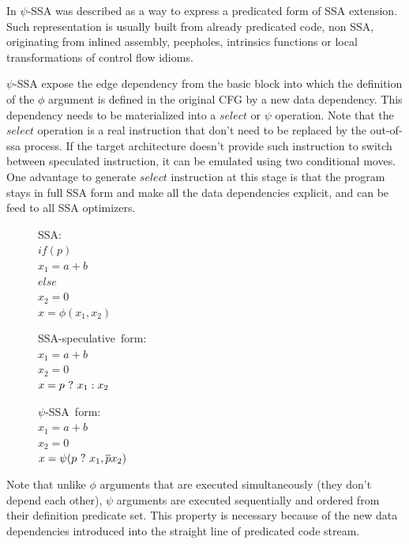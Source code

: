 In \cite{Stoutchinin:2001:ESS:563998.564022} $\psi$-SSA was described as a way to express a predicated form of SSA extension. Such representation is usually built from already predicated code, non SSA, originating from inlined assembly, peepholes, intrinsics functions or local transformations of control flow idioms. 

$\psi$-SSA expose the edge dependency from the basic block into which the definition of the $\phi$ argument is defined in the original CFG by a new data dependency. This dependency needs to be materialized into a $select$ or $\psi$ operation. Note that the $select$ operation is a real instruction that don't need to be replaced by the out-of-ssa process. If the target architecture doesn't provide such instruction to switch between speculated instruction, it can be emulated using two conditional moves. One advantage to generate $select$ instruction at this stage is that the program stays in full SSA form and make all the data dependencies explicit, and can be feed to all SSA optimizers. 

\begin{figure}
\begin{minipage}[t]{3.5cm}
\mbox{SSA:} \\
$ if (p) $ \\
$   x_1 = a+b $ \\
$ else $ \\
$   x_2 = 0 $ \\
$ x = \phi (x_1, x_2) $ \\
\end{minipage}
\begin{minipage}[t]{3.5cm}
\mbox{SSA-speculative form:} \\
$x_1 = a + b $ \\
$x_2 = 0 $ \\
$x = p ~?~  x_1 : x_2$ \\
\end{minipage}
\begin{minipage}[t]{3.5cm}
\mbox{$\psi$-SSA form:} \\
$x_1 = a + b $ \\
$x_2 = 0 $\\
$x = \psi (p ~?~ x_1, \overline{p} x_2) $ \\
\end{minipage}
\end{figure}

Note that unlike $\phi$ arguments that are executed simultaneously (they don't depend each other), $\psi$ arguments are executed sequentially and ordered from their definition predicate set. This property is necessary because of the new data dependencies introduced into the straight line of predicated code stream.

